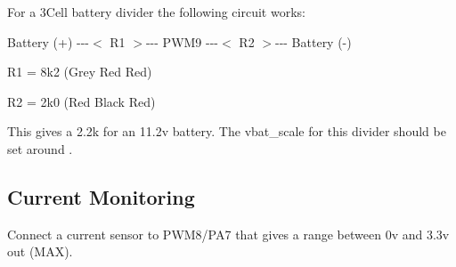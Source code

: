 For a 3\+Cell battery divider the following circuit works\+:

{\ttfamily Battery (+) -\/-\/-\/$<$ R1 $>$-\/-\/-\/ P\+W\+M9 -\/-\/-\/$<$ R2 $>$-\/-\/-\/ Battery (-\/)}


\begin{DoxyItemize}
\item R1 = 8k2 (Grey Red Red)
\item R2 = 2k0 (Red Black Red)
\end{DoxyItemize}

This gives a 2.\+2k for an 11.\+2v battery. The {\ttfamily vbat\+\_\+scale} for this divider should be set around {}.

\subsection*{Current Monitoring}

Connect a current sensor to P\+W\+M8/\+P\+A7 that gives a range between 0v and 3.\+3v out (M\+A\+X). 